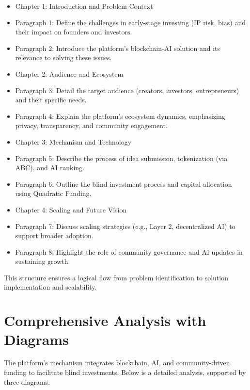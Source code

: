 \documentclass[12pt]{article}
\begin{document}
\begin{itemize}
  \item Chapter 1: Introduction and Problem Context
  \item Paragraph 1: Define the challenges in early-stage investing (IP risk, bias) and their impact on founders and investors.
  \item Paragraph 2: Introduce the platform's blockchain-AI solution and its relevance to solving these issues.

  \item Chapter 2: Audience and Ecosystem
  \item Paragraph 3: Detail the target audience (creators, investors, entrepreneurs) and their specific needs.
  \item Paragraph 4: Explain the platform's ecosystem dynamics, emphasizing privacy, transparency, and community engagement.

  \item Chapter 3: Mechanism and Technology
  \item Paragraph 5: Describe the process of idea submission, tokenization (via ABC), and AI ranking.
  \item Paragraph 6: Outline the blind investment process and capital allocation using Quadratic Funding.

  \item Chapter 4: Scaling and Future Vision
  \item Paragraph 7: Discuss scaling strategies (e.g., Layer 2, decentralized AI) to support broader adoption.
  \item Paragraph 8: Highlight the role of community governance and AI updates in sustaining growth.
\end{itemize}

This structure ensures a logical flow from problem identification to solution implementation and scalability.

\section{Comprehensive Analysis with Diagrams}

The platform's mechanism integrates blockchain, AI, and community-driven funding to facilitate blind investments. Below is a detailed analysis, supported by three diagrams.
\end{document}
